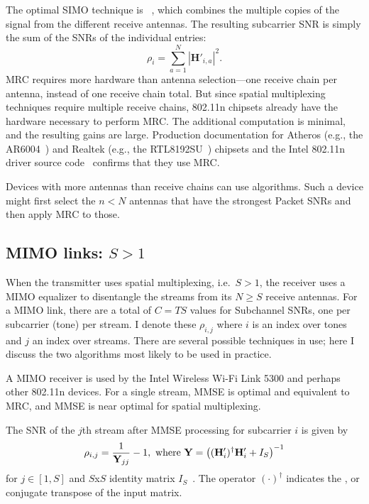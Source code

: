 The optimal SIMO technique is ~\cite{Tse}, which combines the multiple copies of the signal from the different receive antennas. The resulting subcarrier SNR is simply the sum of the SNRs of the individual entries:
\begin{equation}
	\label{eq:mrc}
	\rho_i = \sum_{a=1}^N \left| \mathbf{H}'_{i,a} \right|^2.
\end{equation}
MRC requires more hardware than antenna selection---one receive chain per antenna, instead of one receive chain total. But since spatial multiplexing techniques require multiple receive chains, 802.11n chipsets already have the hardware necessary to perform MRC. The additional computation is minimal, and the resulting gains are large. Production documentation for Atheros (e.g., the AR6004~\cite{ar6004}) and Realtek (e.g., the RTL8192SU~\cite{rtl8192su}) chipsets and the Intel 802.11n driver source code~\cite{iwlwifi} confirms that they use MRC.

Devices with more antennas than receive chains can use  algorithms. Such a device might first select the $n < N$ antennas that have the strongest Packet SNRs and then apply MRC to those.

\subsection{MIMO links: $S>1$}
When the transmitter uses spatial multiplexing, i.e.\ $S>1$, the receiver uses a MIMO equalizer to disentangle the streams from its $N\geq S$ receive antennas. For a MIMO link, there are a total of $C=TS$ values for Subchannel SNRs, one per subcarrier (tone) per stream. I denote these $\rho_{i,j}$ where $i$ is an index over tones and $j$ an index over streams. There are several possible techniques in use; here I discuss the two algorithms most likely to be used in practice.

A  MIMO receiver is used by the Intel Wireless Wi-Fi Link 5300 and perhaps other 802.11n devices. For a single stream, MMSE is optimal and equivalent to MRC, and MMSE is near optimal for spatial multiplexing.

The SNR of the $j$th stream after MMSE processing for subcarrier $i$ is given by
\begin{equation}
\centering
\label{eq:mmse_snr}
\rho_{i,j} = \frac{1}{\mathbf{Y}_{jj}}-1, \text{ where }
\mathbf{Y} = \left((\mathbf{H}'_i)^\dagger \mathbf{H}'_i+I_S\right)^{-1}
\end{equation}
for $j \in [1,S]$ and $S$x$S$ identity matrix $I_S$~\cite{Tse}. The operator $(\cdot)^\dagger$ indicates the , or conjugate transpose of the input matrix.

